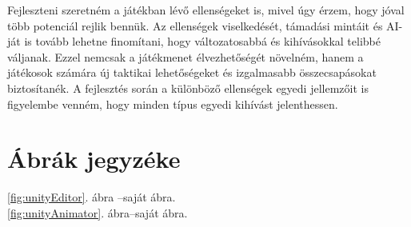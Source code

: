 \documentclass[
]{thesis-ekf}
\theoremstyle{definition}
\theoremstyle{remark}
\begin{document}
Fejleszteni szeretném a játékban lévő ellenségeket is, mivel úgy érzem, hogy jóval több potenciál rejlik bennük. Az ellenségek viselkedését, támadási mintáit és AI-ját is tovább lehetne finomítani, hogy változatosabbá és kihívásokkal telibbé váljanak. Ezzel nemcsak a játékmenet élvezhetőségét növelném, hanem a játékosok számára új taktikai lehetőségeket és izgalmasabb összecsapásokat biztosítanék. A fejlesztés során a különböző ellenségek egyedi jellemzőit is figyelembe venném, hogy minden típus egyedi kihívást jelenthessen.

\chapter*{Ábrák jegyzéke}
\begin{center}
	\ref{fig:unityEditor}. ábra --saját ábra.\\
	\ref{fig:unityAnimator}. ábra--saját ábra.
\end{center}
\end{document}
